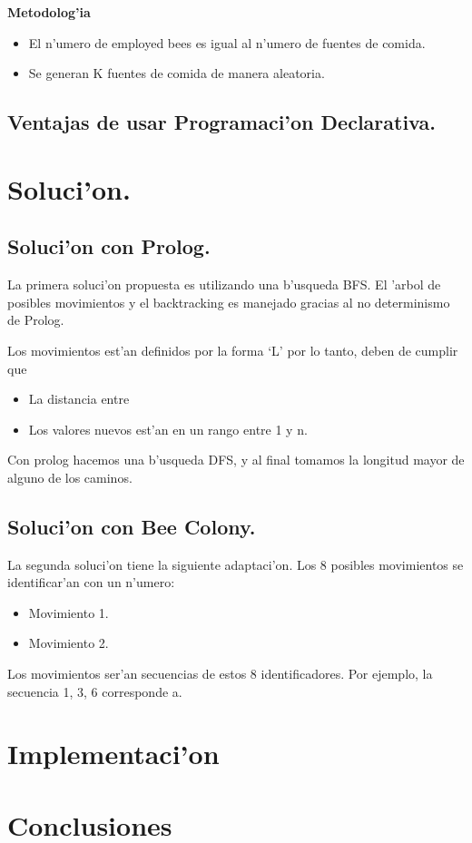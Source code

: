 \documentclass[11pt]{article}
\begin{document}
    \textbf{Metodolog'ia}
    \begin{itemize}
        \item El n'umero de employed bees es igual al n'umero de fuentes de comida.
        \item Se generan K fuentes de comida de manera aleatoria.
    \end{itemize}


    \subsection{Ventajas de usar Programaci'on Declarativa.}

    \section{Soluci'on.}

    \subsection{Soluci'on con Prolog.}
    La primera soluci'on propuesta es utilizando una b'usqueda BFS.
    El 'arbol de posibles movimientos y el backtracking es manejado
    gracias al no determinismo de Prolog.

    Los movimientos est'an definidos por la forma `L' \; por lo tanto, deben de cumplir
    que
    \begin{itemize}
        \item La distancia entre
        \item Los valores nuevos est'an en un rango entre 1 y n.
    \end{itemize}

    Con prolog hacemos una b'usqueda DFS, y al final tomamos
    la longitud mayor de alguno de los caminos.

    \subsection{Soluci'on con Bee Colony.}

    La segunda soluci'on tiene la siguiente adaptaci'on.
    Los 8 posibles movimientos se identificar'an con un n'umero:
    \begin{itemize}
        \item Movimiento 1.
        \item Movimiento 2.
    \end{itemize}

    Los movimientos ser'an secuencias de estos 8 identificadores.
    Por ejemplo, la secuencia 1, 3, 6 corresponde a.
    \section{Implementaci'on}
    
    \section{Conclusiones}
\end{document}
